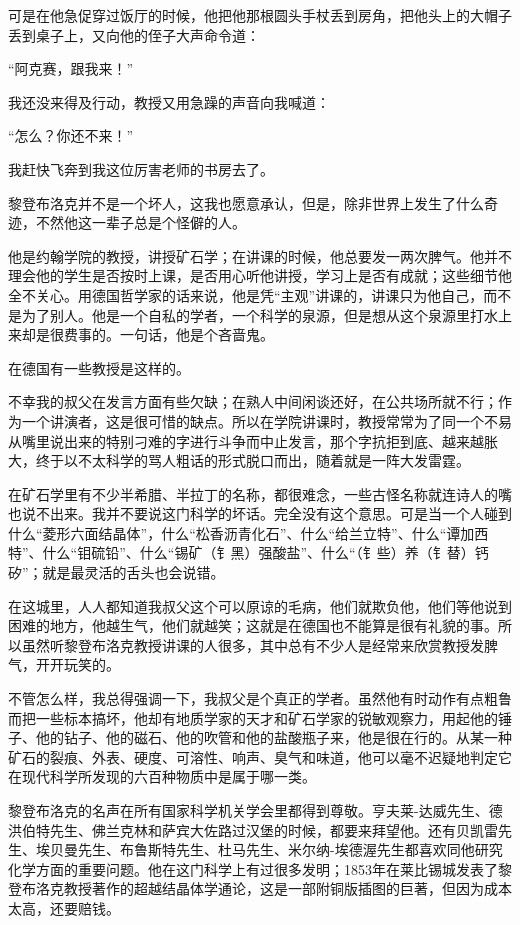 \documentclass[10pt]{book}
\begin{document}
可是在他急促穿过饭厅的时候，他把他那根圆头手杖丢到房角，把他头上的大帽子丢到桌子上，又向他的侄子大声命令道：

“阿克赛，跟我来！”

我还没来得及行动，教授又用急躁的声音向我喊道：

“怎么？你还不来！”

我赶快飞奔到我这位厉害老师的书房去了。

黎登布洛克并不是一个坏人，这我也愿意承认，但是，除非世界上发生了什么奇迹，不然他这一辈子总是个怪僻的人。

他是约翰学院的教授，讲授矿石学；在讲课的时候，他总要发一两次脾气。他并不理会他的学生是否按时上课，是否用心听他讲授，学习上是否有成就；这些细节他全不关心。用德国哲学家的话来说，他是凭“主观”讲课的，讲课只为他自己，而不是为了别人。他是一个自私的学者，一个科学的泉源，但是想从这个泉源里打水上来却是很费事的。一句话，他是个吝啬鬼。

在德国有一些教授是这样的。

不幸我的叔父在发言方面有些欠缺；在熟人中间闲谈还好，在公共场所就不行；作为一个讲演者，这是很可惜的缺点。所以在学院讲课时，教授常常为了同一个不易从嘴里说出来的特别刁难的字进行斗争而中止发言，那个字抗拒到底、越来越胀大，终于以不太科学的骂人粗话的形式脱口而出，随着就是一阵大发雷霆。

在矿石学里有不少半希腊、半拉丁的名称，都很难念，一些古怪名称就连诗人的嘴也说不出来。我并不要说这门科学的坏话。完全没有这个意思。可是当一个人碰到什么“菱形六面结晶体”，什么“松香沥青化石”、什么“给兰立特”、什么“谭加西特”、什么“钼硫铅”、什么“锡矿（钅黑）强酸盐”、什么“（钅些）养（钅替）钙矽”；就是最灵活的舌头也会说错。

在这城里，人人都知道我叔父这个可以原谅的毛病，他们就欺负他，他们等他说到困难的地方，他越生气，他们就越笑；这就是在德国也不能算是很有礼貌的事。所以虽然听黎登布洛克教授讲课的人很多，其中总有不少人是经常来欣赏教授发脾气，开开玩笑的。

不管怎么样，我总得强调一下，我叔父是个真正的学者。虽然他有时动作有点粗鲁而把一些标本搞坏，他却有地质学家的天才和矿石学家的锐敏观察力，用起他的锤子、他的钻子、他的磁石、他的吹管和他的盐酸瓶子来，他是很在行的。从某一种矿石的裂痕、外表、硬度、可溶性、响声、臭气和味道，他可以毫不迟疑地判定它在现代科学所发现的六百种物质中是属于哪一类。

黎登布洛克的名声在所有国家科学机关学会里都得到尊敬。亨夫莱-达威先生、德洪伯特先生、佛兰克林和萨宾大佐路过汉堡的时候，都要来拜望他。还有贝凯雷先生、埃贝曼先生、布鲁斯特先生、杜马先生、米尔纳-埃德渥先生都喜欢同他研究化学方面的重要问题。他在这门科学上有过很多发明；1853年在莱比锡城发表了黎登布洛克教授著作的超越结晶体学通论，这是一部附铜版插图的巨著，但因为成本太高，还要赔钱。
\end{document}
